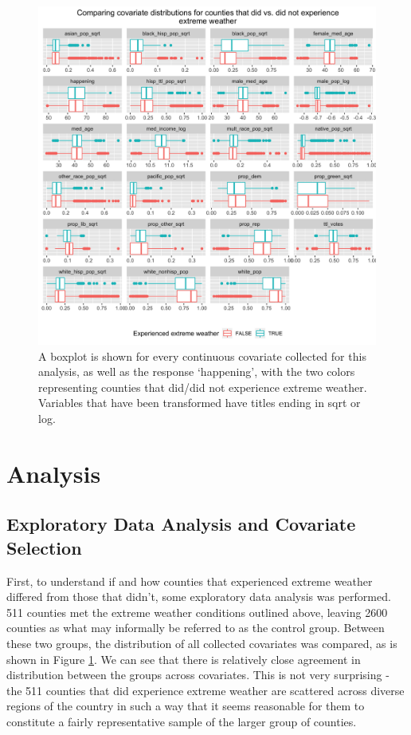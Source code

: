 \documentclass{article}
\begin{document}
\begin{figure}[H]
\centering
\includegraphics[scale=0.2]{images/covariate_dist_comp.png}
\caption{A boxplot is shown for every continuous covariate collected for this analysis, as well as the response `happening', with the two colors representing counties that did/did not experience extreme weather. Variables that have been transformed have titles ending in sqrt or log.}
\label{covariate_comp}
\end{figure}

\section{Analysis}

\subsection{Exploratory Data Analysis and Covariate Selection}
First, to understand if and how counties that experienced extreme weather differed from those that didn't, some exploratory data analysis was performed. 511 counties met the extreme weather conditions outlined above, leaving 2600 counties as what may informally be referred to as the control group. Between these two groups, the distribution of all collected covariates was compared, as is shown in Figure \ref{covariate_comp}. We can see that there is relatively close agreement in distribution between the groups across covariates. This is not very surprising - the 511 counties that did experience extreme weather are scattered across diverse regions of the country in such a way that it seems reasonable for them to constitute a fairly representative sample of the larger group of counties. 
\end{document}

